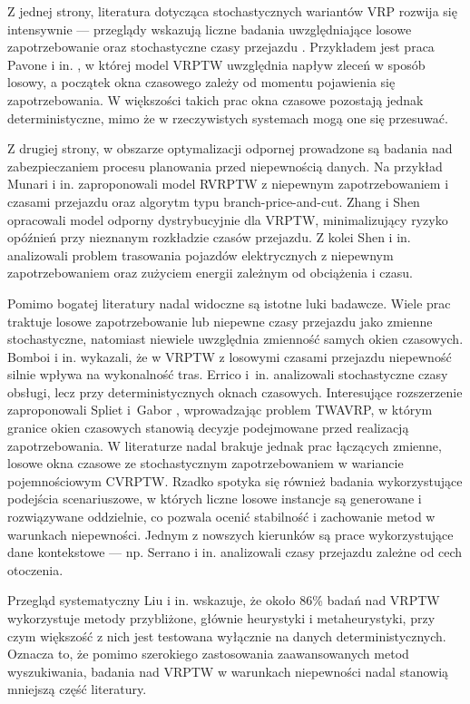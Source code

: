 Z jednej strony, literatura dotycząca stochastycznych wariantów VRP rozwija się intensywnie — przeglądy wskazują liczne badania uwzględniające losowe zapotrzebowanie oraz stochastyczne czasy przejazdu \cite{Oyola2018, Bomboi2022}. Przykładem jest praca Pavone i in. \cite{Pavone2009}, w której model VRPTW uwzględnia napływ zleceń w sposób losowy, a początek okna czasowego zależy od momentu pojawienia się zapotrzebowania. W większości takich prac okna czasowe pozostają jednak deterministyczne, mimo że w rzeczywistych systemach mogą one się przesuwać.

Z drugiej strony, w obszarze optymalizacji odpornej prowadzone są badania nad zabezpieczaniem procesu planowania przed niepewnością danych. Na przykład Munari i in. \cite{Munari2018} zaproponowali model RVRPTW z niepewnym zapotrzebowaniem i czasami przejazdu oraz algorytm typu branch-price-and-cut. Zhang i Shen \cite{Zhang2021} opracowali model odporny dystrybucyjnie dla VRPTW, minimalizujący ryzyko opóźnień przy nieznanym rozkładzie czasów przejazdu. Z kolei Shen i in. \cite{Shen2022} analizowali problem trasowania pojazdów elektrycznych z niepewnym zapotrzebowaniem oraz zużyciem energii zależnym od obciążenia i czasu.

Pomimo bogatej literatury nadal widoczne są istotne luki badawcze. Wiele prac traktuje losowe zapotrzebowanie lub niepewne czasy przejazdu jako zmienne stochastyczne, natomiast niewiele uwzględnia zmienność samych okien czasowych. Bomboi i in. \cite{Bomboi2022} wykazali, że w VRPTW z losowymi czasami przejazdu niepewność silnie wpływa na wykonalność tras. Errico i~in. \cite{Errico2016} analizowali stochastyczne czasy obsługi, lecz przy deterministycznych oknach czasowych. Interesujące rozszerzenie zaproponowali Spliet i~Gabor \cite{Spliet2014}, wprowadzając problem TWAVRP, w którym granice okien czasowych stanowią decyzje podejmowane przed realizacją zapotrzebowania. W literaturze nadal brakuje jednak prac łączących zmienne, losowe okna czasowe ze stochastycznym zapotrzebowaniem w wariancie pojemnościowym CVRPTW. Rzadko spotyka się również badania wykorzystujące podejścia scenariuszowe, w których liczne losowe instancje są generowane i rozwiązywane oddzielnie, co pozwala ocenić stabilność i zachowanie metod w warunkach niepewności. Jednym z nowszych kierunków są prace wykorzystujące dane kontekstowe — np. Serrano i in. \cite{serano2024} analizowali czasy przejazdu zależne od cech otoczenia.

Przegląd systematyczny Liu i in. \cite{liu2023} wskazuje, że około 86\% badań nad VRPTW wykorzystuje metody przybliżone, głównie heurystyki i metaheurystyki, przy czym większość z nich jest testowana wyłącznie na danych deterministycznych. Oznacza to, że pomimo szerokiego zastosowania zaawansowanych metod wyszukiwania, badania nad VRPTW w warunkach niepewności nadal stanowią mniejszą część literatury.

